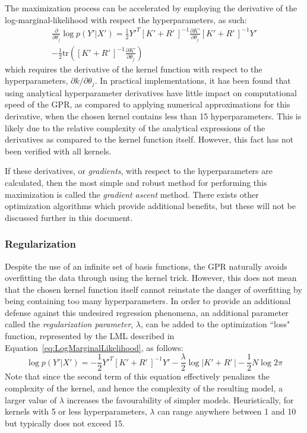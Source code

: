 \documentclass{article}
\begin{document}
The maximization process can be accelerated by employing the derivative of the log-marginal-likelihood with respect the hyperparameters, as such:
\begin{multline}
\label{eq:LogMarginalLikelihoodDerivative}
	\frac{\partial}{\partial \theta_j} \log{p\!\left(Y'|X'\right)} = \frac{1}{2} Y'^T \left[K' + R'\,\right]^{-1} \frac{\partial K'}{\partial \theta_j} \left[K' + R'\,\right]^{-1} Y' \\
	- \frac{1}{2} \text{tr}\!\left(\left[K' + R'\,\right]^{-1} \frac{\partial K'}{\partial \theta_j}\right)
\end{multline}
which requires the derivative of the kernel function with respect to the hyperparameters, $\partial k / \partial \theta_j$. In practical implementations, it has been found that using analytical hyperparameter derivatives have little impact on computational speed of the GPR, as compared to applying numerical approximations for this derivative, when the chosen kernel contains less than 15 hyperparameters. This is likely due to the relative complexity of the analytical expressions of the derivatives as compared to the kernel function itself. However, this fact has not been verified with all kernels.

If these derivatives, or \emph{gradients}, with respect to the hyperparameters are calculated, then the most simple and robust method for performing this maximization is called the \emph{gradient ascent} method. There exists other optimization algorithms which provide additional benefits, but these will not be discussed further in this document.

\subsubsection{Regularization}
\label{subsubsec:Regularization}

Despite the use of an infinite set of basis functions, the GPR naturally avoids overfitting the data through using the kernel trick. However, this does not mean that the chosen kernel function itself cannot reinstate the danger of overfitting by being containing too many hyperparameters. In order to provide an additional defense against this undesired regression phenomena, an additional parameter called the \emph{regularization parameter}, $\lambda$, can be added to the optimization ``loss" function, represented by the LML described in Equation~\eqref{eq:LogMarginalLikelihood}, as follows:
\begin{equation}
\label{eq:LogMarginalLikelihoodRegularized}
	\log{p\!\left(Y'|X'\right)} = -\frac{1}{2} Y'^T \left[K' + R'\,\right]^{-1} Y' - \frac{\lambda}{2} \log{\left|K' + R'\,\right|} - \frac{1}{2} N \log{2\pi}
\end{equation}
Note that since the second term of this equation effectively penalizes the complexity of the kernel, and hence the complexity of the resulting model, a larger value of $\lambda$ increases the favourability of simpler models. Heuristically, for kernels with 5 or less hyperparameters, $\lambda$ can range anywhere between 1 and 10 but typically does not exceed 15.
\end{document}
